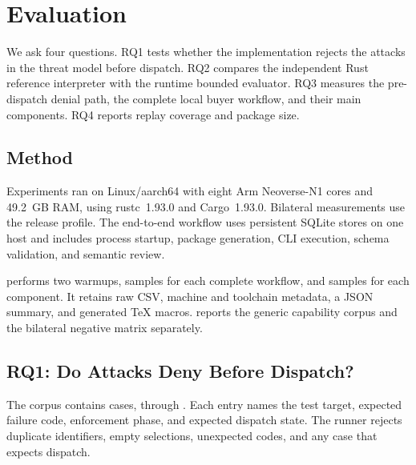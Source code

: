 \section{Evaluation}
\label{sec:evaluation}

We ask four questions. RQ1 tests whether the implementation rejects the
attacks in the threat model before dispatch. RQ2 compares the independent Rust
reference interpreter with the runtime bounded evaluator. RQ3 measures the
pre-dispatch denial path, the complete local buyer workflow, and their main
components. RQ4 reports replay coverage and package size.

\subsection{Method}

Experiments ran on Linux/aarch64 with eight Arm Neoverse-N1 cores and
49.2~GB RAM, using rustc~1.93.0 and Cargo~1.93.0. Bilateral measurements use
the release profile. The end-to-end workflow uses persistent SQLite stores on
one host and includes process startup, package generation, CLI execution,
schema validation, and semantic review.

 performs two warmups,
\PSPathSampleCount{} samples for each complete workflow, and
\PSCriterionSampleCount{} samples for each component. It retains raw CSV,
machine and toolchain metadata, a JSON summary, and generated \TeX{} macros.
 reports the generic capability corpus and the
bilateral negative matrix separately.

\subsection{RQ1: Do Attacks Deny Before Dispatch?}

The corpus contains \PSThreatCaseCount{} cases,
 through . Each entry names the test
target, expected failure code, enforcement phase, and expected dispatch state.
The runner rejects duplicate identifiers, empty selections, unexpected codes,
and any case that expects dispatch.

